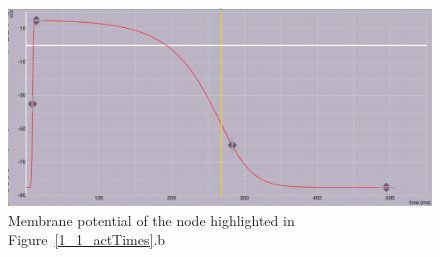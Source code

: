 \documentclass[12pt]{article}
\begin{document}
\begin{figure}[H]
	\centering
	\includegraphics[width=.95\linewidth]{Figures/1_2_actpotential.png}
	
	\caption{Membrane potential of the node highlighted in Figure~\ref{1_1_actTimes}.b}
	\label{1_2_vm}
\end{figure}
\end{document}
